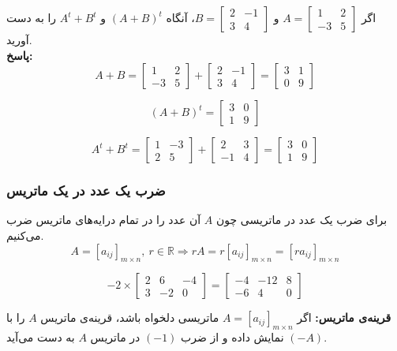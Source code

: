 \begin{example}
	اگر
	$A=\begin{bmatrix}
		1 & 2 \\
		-3 & 5
	\end{bmatrix}$
	و
	$B=\begin{bmatrix}
		2 & -1 \\
		3 & 4
	\end{bmatrix}$،
	آنگاه
	$(A+B)^t$
	و
	$A^t + B^t$
	را به دست آورید. \\
	\textbf{پاسخ:}
	\[
	A+B =
	\begin{bmatrix}
		1 & 2 \\
		-3 & 5
	\end{bmatrix}
	+
	\begin{bmatrix}
		2 & -1 \\
		3 & 4
	\end{bmatrix}
	=
	\begin{bmatrix}
		3 & 1 \\
		0 & 9
	\end{bmatrix}
	\]
	
	\[
	(A+B)^t =
	\begin{bmatrix}
		3 & 0 \\
		1 & 9
	\end{bmatrix}
	\]
	
	\[
	A^t + B^t =
	\begin{bmatrix}
		1 & -3 \\
		2 & 5
	\end{bmatrix}
	+
	\begin{bmatrix}
		2 & 3 \\
		-1 & 4
	\end{bmatrix}
	=
	\begin{bmatrix}
		3 & 0 \\
		1 & 9
	\end{bmatrix}
	\]
\end{example}

\subsubsection*{ضرب یک عدد در یک ماتریس}
برای ضرب یک عدد در ماتریسی چون $A$ آن عدد را در تمام درایه‌های ماتریس ضرب می‌کنیم.
$$A=[a_{ij}]_{m \times n} ,\ r \in \mathbb{R} \Rightarrow rA = r[a_{ij}]_{m \times n} = [ra_{ij}]_{m \times n}$$

\begin{example}
	\[
	-2 \times
	\begin{bmatrix}
	2 & 6 & -4 \\
	3 & -2 & 0
	\end{bmatrix}
	=
	\begin{bmatrix}
		-4 & -12 & 8 \\
		-6 & 4 & 0
	\end{bmatrix}
	\]
\end{example}
\bigskip
\textbf{قرینه‌ی ماتریس:}
اگر
$A=[a_{ij}]_{m \times n}$
ماتریسی دلخواه باشد، قرینه‌ی ماتریس $A$ را با
$(-A)$
نمایش داده و از ضرب
$(-1)$
در ماتریس $A$ به دست می‌آید.

